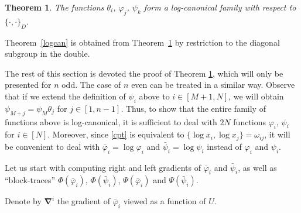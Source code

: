 \documentclass{amsart}
\newtheorem{theorem}{Theorem}
\theoremstyle{definition}
\theoremstyle{remark}
\numberwithin{equation}{section}
\numberwithin{theorem}{section}
\begin{document}
\begin{theorem}
\label{dlogcan}
The functions ${{\theta}}_i$, ${{\varphi}}_j$, ${{\psi}}_k$ form a log-canonical family with respect to ${{\{\cdot,\cdot\}}}_D$. 
\end{theorem}

Theorem~\ref{logcan} is obtained from Theorem~\ref{dlogcan} by restriction to the diagonal subgroup
in the double.

The rest of this section is devoted the proof
of Theorem \ref{dlogcan}, which will only be presented for $n$ odd. The case of $n$ even can be 
treated in a similar way. Observe that if we extend the definition
of ${{\psi}}_i$ above to $i\in [M+1, N]$, we will obtain ${{\psi}}_{M+j}={{\psi}}_M {{\theta}}_j$ for $j\in [1, n-1]$.
Thus, to show that the entire family of functions above is log-canonical, it is sufficient
to deal with $2N$ functions ${{\varphi}}_i$, ${{\psi}}_i$ for $i\in [N]$. Moreover, since \eqref{cpt} is
equivalent to $\{\log x_i,\log x_j\}=\omega_{ij}$, it will be convenient to deal with $\bar{{\varphi}}_i=\log{{\varphi}}_i$ and 
$\bar{{\psi}}_i=\log{{\psi}}_i$ instead of ${{\varphi}}_i$ and ${{\psi}}_i$. 

Let us start with computing  right and left gradients of $\bar{{\varphi}}_i$ and $\bar{{\psi}}_i$, as well as
``block-traces'' ${\Phi}(\bar{{\varphi}}_i)$, ${\Phi}(\bar{{\psi}}_i)$, ${\Psi}(\bar{{\varphi}}_i)$ and ${\Psi}(\bar{{\psi}}_i)$.

Denote by ${\boldsymbol\nabla}^i$ the gradient of $\bar {{\varphi}}_i$ viewed as a function of $U$. 
\end{document}
